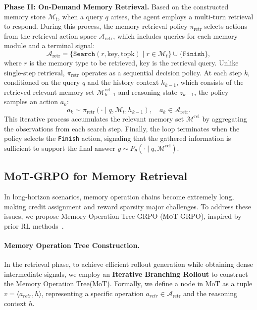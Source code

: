 \documentclass[11pt, a4paper]{lumia}
\newcommand{\ourtrain}{{\textsc{MoT-GRPO}}\xspace} %
\begin{document}
\noindent \textbf{Phase II: On-Demand Memory Retrieval.}
Based on the constructed memory store $\mathcal{M}_{t}$, when a query $q$ arises, the agent employs a multi-turn retrieval to respond. 
During this process, the memory retrieval policy $\pi_{\text{retr}}$ selects actions from the retrieval action space $\mathcal{A}_{\text{retr}}$, which includes queries for each memory module and a terminal signal:
\begin{equation}
\mathcal{A}_{\text{retr}} = \{ \texttt{Search}(r,\text{key},\text{topk}) \mid r \in \mathcal{M}_{t} \} \cup \{ \texttt{Finish} \},
\end{equation}
where $r$ is the memory type to be retrieved, $\text{key}$ is the retrieval query. 
Unlike single-step retrieval, $\pi_{\text{retr}}$ operates as a sequential decision policy. 
At each step $k$, conditioned on the query $q$ and the history context $h_{k-1}$, which consists of the retrieved relevant memory set $\mathcal{M}^{\text{rel}}_{k-1}$ and reasoning state $z_{k-1}$, the policy samples an action $a_k$:
\begin{equation}
\label{eq:retract}
a_k \sim \pi_{\text{retr}}(\cdot \mid q, \mathcal{M}_t, h_{k-1}), \quad a_k \in \mathcal{A}_{\text{retr}}.
\end{equation}
This iterative process accumulates the relevant memory set $\mathcal{M}^{\text{rel}}$ by aggregating the observations from each search step. 
Finally, the loop terminates when the policy selects the \texttt{Finish} action, signaling that the gathered information is sufficient to support the final answer $y \sim P_{\theta}(\cdot \mid q, \mathcal{M}^{\text{rel}})$.

\subsection{MoT-GRPO for Memory Retrieval}
In long-horizon scenarios, memory operation chains become extremely long, making credit assignment and reward sparsity major challenges. To address these issues, we propose Memory Operation Tree GRPO (\ourtrain), inspired by prior RL methods~\citep{shao2024deepseekmath,ji2025treesearchllmagent}.
\label{sec:MoTGRPO}
\paragraph{Memory Operation Tree Construction.}
In the retrieval phase, to achieve efficient rollout generation while obtaining dense intermediate signals, we employ an \textbf{Iterative Branching Rollout} to construct the Memory Operation Tree(MoT). 
Formally, we define a node in MoT as a tuple $v = \langle a_{retr}, h \rangle$, representing a specific operation $a_{retr} \in \mathcal{A}_{\text{retr}}$ and the reasoning context $h$.
\end{document}
